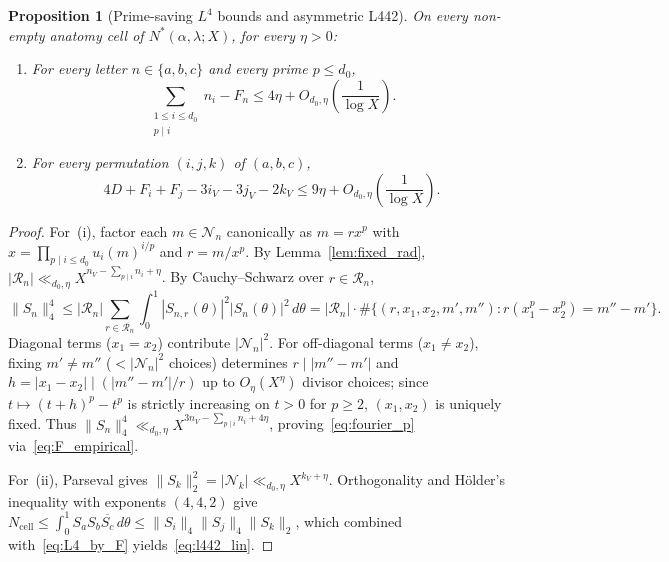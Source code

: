 \documentclass[11pt,a4paper]{amsart}
\theoremstyle{plain}
\newtheorem{proposition}[theorem]{Proposition}
\theoremstyle{definition}
\theoremstyle{remark}
\begin{document}
\begin{proposition}[Prime-saving $L^4$ bounds and asymmetric \textsf{L442}]\label{prop:l442}
On every non-empty anatomy cell of $N^*(\alpha,\lambda;X)$, for every $\eta > 0$:
\begin{enumerate}[label=(\roman*)]
\item For every letter $n \in \{a,b,c\}$ and every prime $p \le d_0$,
\begin{equation}\label{eq:fourier_p}
  \sum_{\substack{1 \le i \le d_0 \\ p \mid i}} n_i - F_n \le 4\eta + O_{d_0,\eta}\!\left(\frac{1}{\log X}\right).
\end{equation}
\item For every permutation $(i,j,k)$ of $(a,b,c)$,
\begin{equation}\label{eq:l442_lin}
  4 D + F_i + F_j - 3 i_V - 3 j_V - 2 k_V \le 9\eta + O_{d_0,\eta}\!\left(\frac{1}{\log X}\right).
\end{equation}
\end{enumerate}
\end{proposition}
\begin{proof}
For~(i), factor each $m \in \mathcal{N}_n$ canonically as $m = r x^p$ with $x = \prod_{p \mid i \le d_0} u_i(m)^{i/p}$ and $r = m/x^p$. By Lemma~\ref{lem:fixed_rad}, $|\mathcal{R}_n| \ll_{d_0,\eta} X^{n_V - \sum_{p \mid i} n_i + \eta}$. By Cauchy--Schwarz over $r \in \mathcal{R}_n$,
\[
  \|S_n\|_4^4 \le |\mathcal{R}_n| \sum_{r \in \mathcal{R}_n} \int_0^1 |S_{n,r}(\theta)|^2 |S_n(\theta)|^2\,d\theta
  = |\mathcal{R}_n| \cdot \#\bigl\{(r,x_1,x_2,m',m'') : r(x_1^p - x_2^p) = m'' - m'\bigr\}.
\]
Diagonal terms ($x_1 = x_2$) contribute $|\mathcal{N}_n|^2$. For off-diagonal terms ($x_1 \neq x_2$), fixing $m' \neq m''$ ($< |\mathcal{N}_n|^2$ choices) determines $r \mid |m''-m'|$ and $h = |x_1-x_2| \mid (|m''-m'|/r)$ up to $O_\eta(X^\eta)$ divisor choices; since $t \mapsto (t+h)^p - t^p$ is strictly increasing on $t > 0$ for $p \ge 2$, $(x_1, x_2)$ is uniquely fixed. Thus $\|S_n\|_4^4 \ll_{d_0,\eta} X^{3 n_V - \sum_{p \mid i} n_i + 4\eta}$, proving~\eqref{eq:fourier_p} via~\eqref{eq:F_empirical}.

For~(ii), Parseval gives $\|S_k\|_2^2 = |\mathcal{N}_k| \ll_{d_0,\eta} X^{k_V + \eta}$. Orthogonality and H\"older's inequality with exponents $(4,4,2)$ give $N_{\mathrm{cell}} \le \int_0^1 S_a S_b \overline{S_c}\,d\theta \le \|S_i\|_4 \|S_j\|_4 \|S_k\|_2$, which combined with~\eqref{eq:L4_by_F} yields~\eqref{eq:l442_lin}.
\end{proof}
\end{document}
